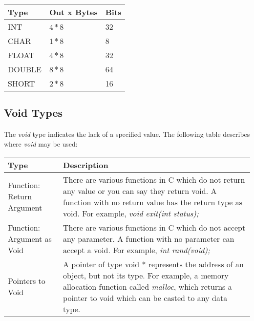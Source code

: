 \begin{center}
   \begin{tabular}{ || p{1in} | p{2in} | p{2in} || }
   \hline
   \textbf{Type} & \textbf{Out x Bytes} & \textbf{Bits} \\ [0.75ex]
   \hline\hline
   INT & \(4 * 8\) & 32 \\
   \hline
   CHAR & \(1 * 8\) & 8 \\
   \hline
   FLOAT & \(4 * 8\) & 32 \\
   \hline
   DOUBLE & \(8 * 8\) & 64 \\
   \hline
   SHORT & \(2 * 8\) & 16 \\
   \hline
   \end{tabular}
\end{center}

\newpage

\subsection{Void Types}
   \paragraph{}
      The \textit{void} type indicates the lack of a specified value. The following table describes where \textit{void} may be used:
      \begin{center}
         \begin{tabular}{ || p{2in} | p{4in} || }
         \hline
         \textbf{Type} & \textbf{Description} \\ [1ex]
         \hline\hline
         Function: Return Argument & There are various functions in C which do not return any value or you can say they return void. A function with
         no return value has the return type as void. For example, \textit{void exit(int status);} \\ [0.4ex]
         \hline
         Function: Argument as Void & There are various functions in C which do not accept any parameter. A function with no parameter can accept a
         void. For example, \textit{int rand(void);} \\ [0.6ex]
         \hline
         Pointers to Void & A pointer of type void * represents the address of an object, but not its type. For example, a memory allocation function 
         called \textit{malloc}, which returns a pointer to void which can be casted to any data type. \\ [0.4ex]
         \hline
         \end{tabular}
      \end{center}

